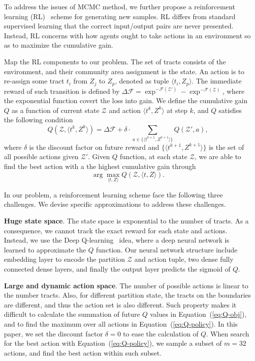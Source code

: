 To address the issues of MCMC method, we further propose a reinforcement learning (RL)~\cite{sutton1998reinforcement} scheme for generating new samples. RL differs from standard supervised learning that the correct input/output pairs are never presented. Instead, RL concerns with how agents ought to take actions in an environment so as to maximize the cumulative gain.

Map the RL components to our problem. The set of tracts consists of the environment, and their community area assignment is the state. An action is to re-assign some tract $t_i$ from $Z_j$ to $Z_p$, denoted as tuple $\langle t_i, Z_p\rangle$. The immediate reward of such transition is defined by $\Delta \mathcal{F} = \exp^{-\mathcal{F}(\mathcal{Z}')} - \exp^{ -\mathcal{F}(\mathcal{Z})}$, where the exponential function covert the loss into gain. We define the cumulative gain $Q$ as a function of current state $\mathcal{Z}$ and action $\langle t^k, Z^k \rangle$ at step $k$, and $Q$ satisfies the following condition
\begin{equation}
\label{eq:Q-obj}
Q(\mathcal{Z}, \langle t^k, Z^k \rangle) = \Delta \mathcal{F} + \delta \cdot \sum_{a \in \{\langle t^{k+1}, Z^{k+1} \rangle\}} Q(\mathcal{Z}', a),
\end{equation}
where $\delta$ is the discount factor on future reward and $\{\langle t^{k+1}, Z^{k+1} \rangle\}$ is the set of all possible actions given $\mathcal{Z}'$. Given $Q$ function, at each state $\mathcal{Z}$, we are able to find the best action with a the highest cumulative gain through
\begin{equation}
\label{eq:Q-policy}
\arg\max_{\langle t, Z \rangle} Q(\mathcal{Z}, \langle t, Z \rangle).
\end{equation}


In our problem, a reinforcement learning scheme face the following three challenges. We devise specific approximations to address these challenges.

\textbf{Huge state space}. The state space is exponential to the number of tracts. As a consequence, we cannot track the exact reward for each state and actions. Instead, we use the Deep Q-learning~\cite{van2016deep} idea, where a deep neural network is learned to approximate the $Q$ function. Our neural network structure include embedding layer to encode the partition $\mathcal{Z}$ and action tuple, two dense fully connected dense layers, and finally the output layer predicts the sigmoid of $Q$.

\textbf{Large and dynamic action space}. The number of possible actions is linear to the number tracts. Also, for different partition state, the tracts on the boundaries are different, and thus the action set is also different. Such property makes it difficult to calculate the summation of future $Q$ values in Equation~(\ref{eq:Q-obj}), and to find the maximum over all actions in Equation~(\ref{eq:Q-policy}). In this paper, we set the discount factor $\delta = 0$ to ease the calculation of $Q$. When search for the best action with Equation~(\ref{eq:Q-policy}), we sample a subset of $m=32$ actions, and find the best action within such subset.


